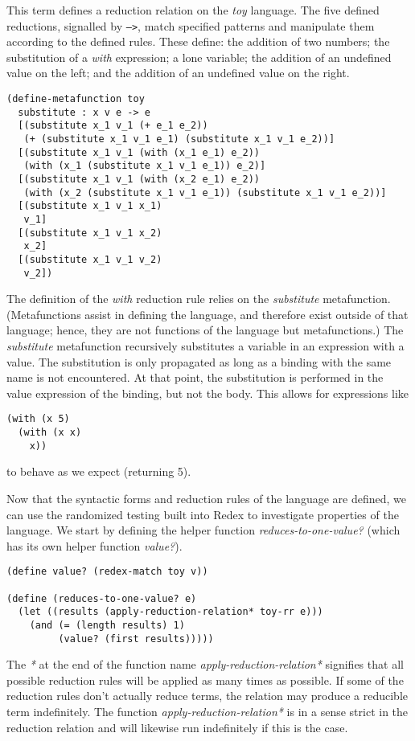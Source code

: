 \documentclass[ms,electronic,twosidetoc,letterpaper,chaptercenter,parttop]{byumsphd}
\begin{document}
This term defines a reduction relation on the \emph{toy} language. The five defined
reductions, signalled by \texttt{-->}, match specified patterns and manipulate them
according to the defined rules. These define: the addition of two numbers; the
substitution of a \emph{with} expression; a lone variable; the addition of an undefined
value on the left; and the addition of an undefined value on the right.

\begin{verbatim}
(define-metafunction toy
  substitute : x v e -> e
  [(substitute x_1 v_1 (+ e_1 e_2))
   (+ (substitute x_1 v_1 e_1) (substitute x_1 v_1 e_2))]
  [(substitute x_1 v_1 (with (x_1 e_1) e_2))
   (with (x_1 (substitute x_1 v_1 e_1)) e_2)]
  [(substitute x_1 v_1 (with (x_2 e_1) e_2))
   (with (x_2 (substitute x_1 v_1 e_1)) (substitute x_1 v_1 e_2))]
  [(substitute x_1 v_1 x_1)
   v_1]
  [(substitute x_1 v_1 x_2)
   x_2]
  [(substitute x_1 v_1 v_2)
   v_2])
\end{verbatim}

The definition of the \emph{with} reduction rule relies on the \emph{substitute}
metafunction. (Metafunctions assist in defining the language, and therefore exist outside
of that language; hence, they are not functions of the language but metafunctions.) The
\emph{substitute} metafunction recursively substitutes a variable in an expression with a 
value. The substitution is only propagated as long as a binding with the same name is not 
encountered. At that point, the substitution is performed in the value expression of the 
binding, but not the body. This allows for expressions like
\begin{verbatim}
(with (x 5)
  (with (x x)
    x))
\end{verbatim}
to behave as we expect (returning 5).

Now that the syntactic forms and reduction rules of the language are defined, we can use 
the randomized testing built into Redex to investigate properties of the language. We 
start by defining the helper function \emph{reduces-to-one-value?} (which has its own 
helper function \emph{value?}).
\begin{verbatim}
(define value? (redex-match toy v))

(define (reduces-to-one-value? e)
  (let ((results (apply-reduction-relation* toy-rr e)))
    (and (= (length results) 1)
         (value? (first results)))))
\end{verbatim}
The \emph{*} at the end of the function name \emph{apply-reduction-relation*} signifies
that all possible reduction rules will be applied as many times as possible. If some of
the reduction rules don't actually reduce terms, the relation may produce a reducible term
indefinitely. The function \emph{apply-reduction-relation*} is in a sense strict in the
reduction relation and will likewise run indefinitely if this is the case.
\end{document}
